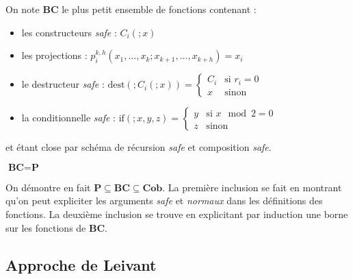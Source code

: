 \documentclass{report}
\begin{document}
			
			\begin{definition}
				\label{def:BC}
				On note $\textbf{BC}$ le plus petit ensemble de fonctions contenant :
				
				\begin{itemize}[itemsep=-1mm]
					\item 	les constructeurs \emph{safe} : $C_i\left(; x\right)$
					\item 	les projections : $p_i^{k,h} \left( x_1, \dots, x_{k}; x_{k+1}, \dots, x_{k+h}\right) = x_i$
					\item 	le destructeur \emph{safe} : $\text{dest} \left( ; C_i\left(; x\right) \right) = 
								\left\lbrace \begin{array}{ll}
									C_i	& \text{si $r_i = 0$} \\
									x	& \text{sinon}
								\end{array} \right.$
					\item 	la conditionnelle \emph{safe} : $\text{if}\left( ; x, y, z \right) = 
						\left\lbrace \begin{array}{ll}
							y	& \text{si $x \mod{2} = 0$} \\
							z	& \text{sinon}
						\end{array} \right.$
				\end{itemize}
				
				et étant close par schéma de récursion \emph{safe} et composition \emph{safe}.
				
			\end{definition}
			
			
			\begin{theorem}
				\label{thm:BC_equals_P}
				$\textbf{BC} = \textbf{P}$
			\end{theorem}
	
			On démontre en fait $\textbf{P} \subseteq \textbf{BC} \subseteq \textbf{Cob}$. La première inclusion se fait en montrant qu'on peut expliciter les arguments \emph{safe} et \emph{normaux} dans les définitions des fonctions. La deuxième inclusion se trouve en explicitant par induction une borne sur les fonctions de $\textbf{BC}$. 
		
		
		
		\subsection{Approche de Leivant}
		\label{subsec:Leivant}
	
\end{document}

